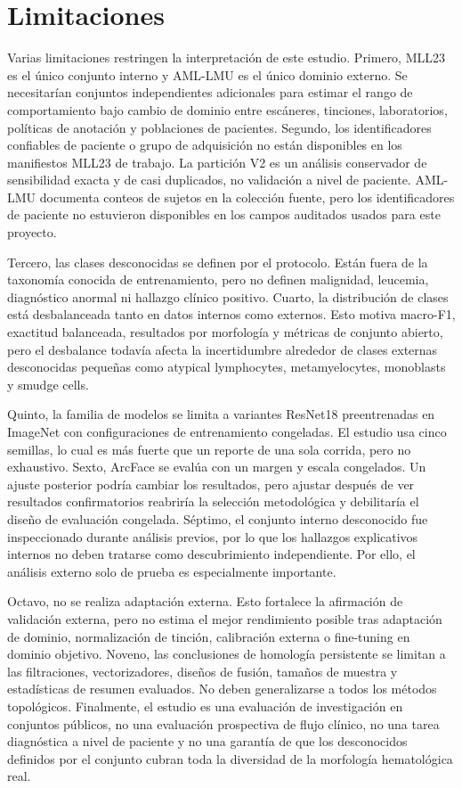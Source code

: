 \documentclass[11pt]{article}
\begin{document}
\section{Limitaciones}

Varias limitaciones restringen la interpretación de este estudio. Primero, MLL23 es el único conjunto interno y AML-LMU es el único dominio externo. Se necesitarían conjuntos independientes adicionales para estimar el rango de comportamiento bajo cambio de dominio entre escáneres, tinciones, laboratorios, políticas de anotación y poblaciones de pacientes. Segundo, los identificadores confiables de paciente o grupo de adquisición no están disponibles en los manifiestos MLL23 de trabajo. La partición V2 es un análisis conservador de sensibilidad exacta y de casi duplicados, no validación a nivel de paciente. AML-LMU documenta conteos de sujetos en la colección fuente, pero los identificadores de paciente no estuvieron disponibles en los campos auditados usados para este proyecto.

Tercero, las clases desconocidas se definen por el protocolo. Están fuera de la taxonomía conocida de entrenamiento, pero no definen malignidad, leucemia, diagnóstico anormal ni hallazgo clínico positivo. Cuarto, la distribución de clases está desbalanceada tanto en datos internos como externos. Esto motiva macro-F1, exactitud balanceada, resultados por morfología y métricas de conjunto abierto, pero el desbalance todavía afecta la incertidumbre alrededor de clases externas desconocidas pequeñas como atypical lymphocytes, metamyelocytes, monoblasts y smudge cells.

Quinto, la familia de modelos se limita a variantes ResNet18 preentrenadas en ImageNet con configuraciones de entrenamiento congeladas. El estudio usa cinco semillas, lo cual es más fuerte que un reporte de una sola corrida, pero no exhaustivo. Sexto, ArcFace se evalúa con un margen y escala congelados. Un ajuste posterior podría cambiar los resultados, pero ajustar después de ver resultados confirmatorios reabriría la selección metodológica y debilitaría el diseño de evaluación congelada. Séptimo, el conjunto interno desconocido fue inspeccionado durante análisis previos, por lo que los hallazgos explicativos internos no deben tratarse como descubrimiento independiente. Por ello, el análisis externo solo de prueba es especialmente importante.

Octavo, no se realiza adaptación externa. Esto fortalece la afirmación de validación externa, pero no estima el mejor rendimiento posible tras adaptación de dominio, normalización de tinción, calibración externa o fine-tuning en dominio objetivo. Noveno, las conclusiones de homología persistente se limitan a las filtraciones, vectorizadores, diseños de fusión, tamaños de muestra y estadísticas de resumen evaluados. No deben generalizarse a todos los métodos topológicos. Finalmente, el estudio es una evaluación de investigación en conjuntos públicos, no una evaluación prospectiva de flujo clínico, no una tarea diagnóstica a nivel de paciente y no una garantía de que los desconocidos definidos por el conjunto cubran toda la diversidad de la morfología hematológica real.
\end{document}
